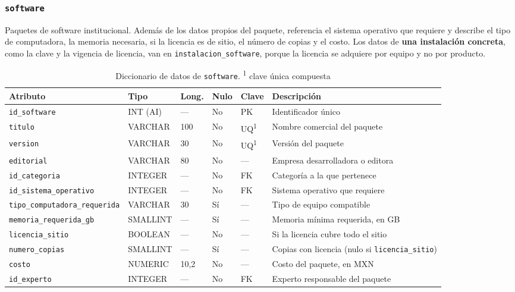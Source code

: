 \documentclass[10pt,a4paper]{article}
\begin{document}
\subsubsection{\texttt{software}}

Paquetes de software institucional. Además de los datos propios del paquete, referencia el sistema operativo que requiere y describe el tipo de computadora, la memoria necesaria, si la licencia es de sitio, el número de copias y el costo. Los datos de \textbf{una instalación concreta}, como la clave y la vigencia de licencia, van en \texttt{instalacion\_software}, porque la licencia se adquiere por equipo y no por producto.

\begin{table}[H]
	\centering
	\footnotesize
	\begin{tabular}{p{4cm} | p{1.6cm} | p{0.8cm} | p{0.7cm} | p{1cm} | p{6.3cm}}\hline \hline
		\textbf{Atributo} & \textbf{Tipo} & \textbf{Long.} & \textbf{Nulo} & \textbf{Clave} & \textbf{Descripción} \\ \hline \hline
		\texttt{id\_software} & INT (AI) & --- & No & PK & Identificador único \\ \hline
		\texttt{titulo} & VARCHAR & 100 & No & UQ\textsuperscript{1} & Nombre comercial del paquete \\ \hline
		\texttt{version} & VARCHAR & 30 & No & UQ\textsuperscript{1} & Versión del paquete \\ \hline
		\texttt{editorial} & VARCHAR & 80 & No & --- & Empresa desarrolladora o editora \\ \hline
		\texttt{id\_categoria} & INTEGER & --- & No & FK & Categoría a la que pertenece \\ \hline
		\texttt{id\_sistema\_operativo} & INTEGER & --- & No & FK & Sistema operativo que requiere \\ \hline
		\texttt{tipo\_computadora\_requerida} & VARCHAR & 30 & Sí & --- & Tipo de equipo compatible \\ \hline
		\texttt{memoria\_requerida\_gb} & SMALLINT & --- & Sí & --- & Memoria mínima requerida, en GB \\ \hline
		\texttt{licencia\_sitio} & BOOLEAN & --- & No & --- & Si la licencia cubre todo el sitio \\ \hline
		\texttt{numero\_copias} & SMALLINT & --- & Sí & --- & Copias con licencia (nulo si \texttt{licencia\_sitio}) \\ \hline
		\texttt{costo} & NUMERIC & 10,2 & No & --- & Costo del paquete, en MXN \\ \hline
		\texttt{id\_experto} & INTEGER & --- & No & FK & Experto responsable del paquete \\ \hline \hline
	\end{tabular}
	\caption{Diccionario de datos de \texttt{software}. \textsuperscript{1} clave única compuesta}
	\label{tabla:dic-software}
\end{table}
\end{document}
